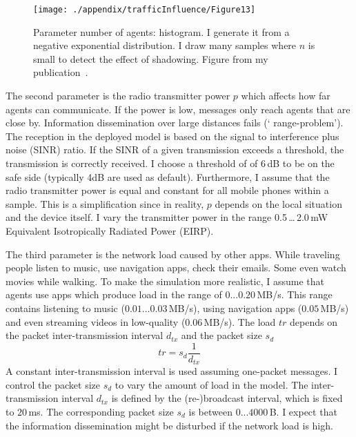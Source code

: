 \begin{figure}[H]
\centering
\texttt{[image: ./appendix/trafficInfluence/Figure13]}%
\caption[Parameter number of agents: histogram]{Parameter number of agents: histogram. I generate it from a negative exponential distribution. I draw many  samples where $n$ is small to detect the effect of shadowing. Figure from my publication~\cite{mayr-2021-com}.}
\label{fig:histNum}%
\end{figure}%

The second parameter is the radio transmitter power $p$ which affects how far
agents can communicate. If the power is low, messages only reach agents that are
close by. Information dissemination over large distances fails (\lq
range-problem\rq). The reception in the deployed model is based on the
signal to interference plus noise (SINR) ratio. If the SINR of a given
transmission exceeds a threshold, the transmission is correctly received. I choose a threshold of {of} 6\,dB to be on the safe side (typically 4dB are used as default). Furthermore, I assume that
the radio transmitter power is equal and constant for all mobile phones within a  sample. This is a
simplification since in reality, $p$ depends on the
local situation and the device itself. I vary the transmitter power in the range 0.5\,\dots\,2.0\,mW Equivalent Isotropically Radiated Power (EIRP).

The third parameter is the network load caused by other apps. While traveling people listen to music, use navigation apps, check their emails.  Some even watch movies while walking. To make the simulation more realistic, I assume that agents use apps which produce load in the range of $ 0... 0.20$\,MB/s. This range contains listening to music ($0.01 ... 0.03$\,MB/s), using navigation apps ($0.05$\,MB/s) and even streaming videos in low-quality ($0.06$\,MB/s).
The load ${tr}$ depends on the packet inter-transmission interval $d_{tx}$ and the packet size $s_d$ \begin{equation}
{tr} = s_d \frac{1} {d_{tx}}
\label{eq:trafSize}
\end{equation}
A constant inter-transmission interval is used assuming one-packet messages. I control the packet size $s_d$ to vary the amount of load in the model. The inter-transmission interval $d_{tx}$ is defined by the (re-)broadcast interval, which is fixed to $20$\,ms. The corresponding packet size $s_d$ is between $0 ... 4000$\,B. I expect that the information dissemination might be disturbed if the network load is high.


